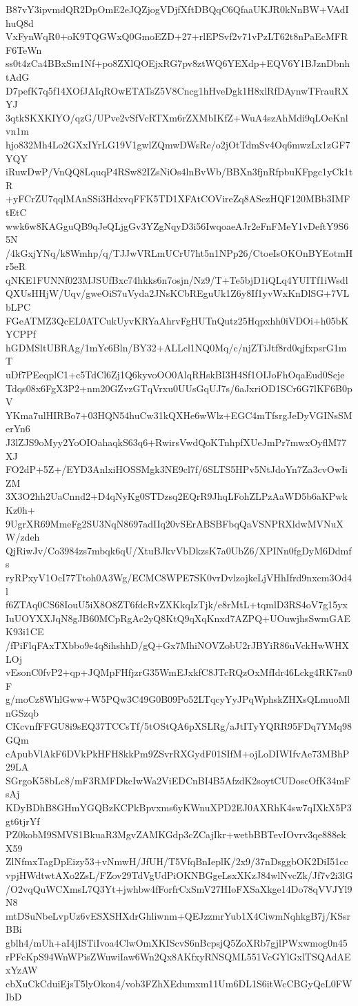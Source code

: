B87vY3ipvmdQR2DpOmE2eJQZjogVDjfXftDBQqC6QfaaUKJR0kNnBW+VAdIhuQ8d
VxFynWqR0+oK9TQGWxQ0GmoEZD+27+rlEPSvf2v71vPzLT62t8nPaEcMFRF6TeWn
ss0t4zCa4BBxSm1Nf+po8ZXlQOEjxRG7pv8ztWQ6YEXdp+EQV6Y1BJznDbnhtAdG
D7pefK7q5f14XOfJAIqROwETATsZ5V8Cncg1hHveDgk1H8xlRfDAynwTFrauRXYJ
3qtkSKXKIYO/qzG/UPve2vSfVcRTXm6rZXMbIKfZ+WuA4szAhMdi9qLOeKnlvn1m
hjo832Mh4Lo2GXxIYrLG19V1gwlZQmwDWsRe/o2jOtTdmSv4Oq6mwzLx1zGF7YQY
iRuwDwP/VnQQ8LquqP4RSw82IZsNiOs4lnBvWb/BBXn3fjnRfpbuKFpgc1yCk1tR
+yFCrZU7qqlMAnSSi3HdxvqFFK5TD1XFAtCOVireZq8ASezHQF120MBb3IMFtEtC
wwk6w8KAGguQB9qJeQLjgGv3YZgNqyD3i56IwqoaeAJr2eFnFMeY1vDeftY9S65N
/4kGxjYNq/k8Wmhp/q/TJJwVRLmUCrU7ht5n1NPp26/CtoeIsOKOnBYEotmHr5eR
qNKE1FUNNf023MJSUfBxc74hkks6n7osjn/Nz9/T+Te5bjD1iQLq4YUITf1iWsdl
QXUsHHjW/Uqv/gweOiS7uVyda2JNsKCbREguUk1Z6y8If1yvWxKnDlSG+7VLbLPC
FGeATMZ3QcEL0ATCukUyvKRYaAhrvFgHUTnQutz25Hqpxhh0iVDOi+h05bKYCPPf
hGDMSltUBRAg/1mYc6Bln/BY32+ALLcl1NQ0Mq/c/njZTiJtf8rd0qjfxpsrG1mT
uDf7PEeqplC1+c5TdCl6Zj1Q6kyvoOO0AlqRHskBI3H4Sf1OIJoFhOqaEud0Scje
Tdqs08x6FgX3P2+nm20GZvzGTqVrxu0UUsGqUJ7s/6aJxriOD1SCr6G7lKF6B0pV
YKma7ulHIRBo7+03HQN54huCw31kQXHe6wWlz+EGC4mTfsrgJeDyVGINsSMerYn6
J3lZJS9oMyy2YoOIOahaqkS63q6+RwirsVwdQoKTnhpfXUeJmPr7mwxOyflM77XJ
FO2dP+5Z+/EYD3AnlxiHOSSMgk3NE9cl7f/6SLTS5HPv5NtJdoYn7Za3cvOwIiZM
3X3O2hh2UaCnnd2+D4qNyKg0STDzsq2EQrR9JhqLFohZLPzAaWD5b6aKPwkKz0h+
9UgrXR69MmeFg2SU3NqN8697adIIq20vSErABSBFbqQaVSNPRXldwMVNuXW/zdeh
QjRiwJv/Co3984zs7mbqk6qU/XtuBJkvVbDkzsK7a0UbZ6/XPINn0fgDyM6Ddmfs
ryRPxyV1OcI77Ttoh0A3Wg/ECMC8WPE7SK0vrDvlzojkeLjVHhIfrd9nxcm3Od4l
f6ZTAq0CS68IouU5iX8O8ZT6fdcRvZXKkqIzTjk/e8rMtL+tqmlD3RS4oV7g15yx
IuUOYXXJqN8gJB60MCpRgAc2yQ8KtQ9qXqKnxd7AZPQ+UOuwjhsSwmGAEK93i1CE
/fPiFlqFAxTXbbo9e4q8ihshhD/gQ+Gx7MhiNOVZobU2rJBYiR86uVckHwWHXLOj
vEsonC0fvP2+qp+JQMpFHfjzrG35WmEJxkfC8JTcRQzOxMfIdr46Lckg4RK7sn0F
g/moCz8WhlGww+W5PQw3C49G0B09Po52LTqcyYyJPqWphskZHXsQLmuoMlnGSzqb
CKcvnfFFGU8i9sEQ37TCCsTf/5tOStQA6pXSLRg/aJtITyYQRR95FDq7YMq98GQm
cApubVlAkF6DVkPkHFH8kkPm9ZSvrRXGydF01SIfM+ojLoDIWIfvAe73MBhP29LA
SGrgoK58bLc8/mF3RMFDkcIwWa2ViEDCnBI4B5AfzdK2soytCUDoscOfK34mFsAj
KDyBDhB8GHmYGQBzKCPkBpvxms6yKWnuXPD2EJ0AXRhK4sw7qIXkX5P3gt6tjrYf
PZ0kobM9SMVS1BkuaR3MgvZAMKGdp3cZCajIkr+wetbBBTevIOvrv3qe888ekX59
ZlNfmxTagDpEizy53+vNmwH/JfUH/T5VfqBnIeplK/2x9/37nDsggbOK2DiI51cc
vpjHWdtwtAXo2ZsL/FZov29TdVgUdPiOKNBGgeLsxXKzJ84wlNvcZk/Jf7v2i3lG
/O2vqQuWCXmsL7Q3Yt+jwhbw4fForfrCxSmV27HIoFXSaXkge14Do78qVVJYl9N8
mtDSuNbeLvpUz6vESXSHXdrGhliwnm+QEJzzmrYub1X4CiwmNqhkgB7j/KSsrBBi
gblh4/mUh+aI4jISTiIvoa4ClwOmXKIScvS6nBcpsjQ5ZoXRb7gjlPWxwmog0n45
rPFcKpS94WnWPisZWuwiIaw6Wn2Qx8AKfxyRNSQML551VcGYlGxlTSQAdAExYzAW
cbXuCkCduiEjsT5lyOkon4/vob3FZhXEdumxm11Um6DL1S6itWcCBGyQeL0FWIbD
